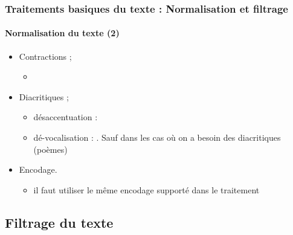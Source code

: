 \documentclass[xcolor=table]{beamer}
\begin{document}
\begin{frame}
\frametitle{Traitements basiques du texte : Normalisation et filtrage}
\framesubtitle{Normalisation du texte (2)}
\begin{itemize}
	
	\item Contractions ;
	\begin{itemize}
		\item {}
	\end{itemize}
	
	\item Diacritiques ;
	\begin{itemize}
		\item désaccentuation :  
		\item dé-vocalisation :  . Sauf dans les cas où on a besoin des diacritiques (poèmes)
	\end{itemize}

	\item Encodage.
	\begin{itemize}
		\item il faut utiliser le même encodage supporté dans le traitement
	\end{itemize}

\end{itemize}

\end{frame}

\subsection{Filtrage du texte}
\end{document}
